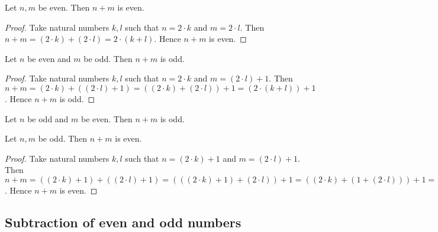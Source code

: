 \documentclass[../../arithmetic.tex]{subfiles}
\begin{document}
  \begin{forthel}
    \begin{proposition}\label{Arithmetic_03_07_501002}
      Let $n, m$ be even.
      Then $n + m$ is even.
    \end{proposition}
    \begin{proof}
      Take natural numbers $k, l$ such that $n = 2 \cdot k$ and $m = 2 \cdot l$.
      Then $n + m =
      (2 \cdot k) + (2 \cdot l) =
      2 \cdot (k + l)$.
      Hence $n + m$ is even.
    \end{proof}

    \begin{proposition}\label{Arithmetic_03_07_434363}
      Let $n$ be even and $m$ be odd.
      Then $n + m$ is odd.
    \end{proposition}
    \begin{proof}
      Take natural numbers $k, l$ such that $n = 2 \cdot k$ and $m = (2 \cdot l) + 1$.
      Then $n + m =
      (2 \cdot k) + ((2 \cdot l) + 1) =
      ((2 \cdot k) + (2 \cdot l)) + 1 =
      (2 \cdot (k + l)) + 1$.
      Hence $n + m$ is odd.
    \end{proof}

    \begin{corollary}\label{Arithmetic_03_07_763076}
      Let $n$ be odd and $m$ be even.
      Then $n + m$ is odd.
    \end{corollary}

    \begin{proposition}\label{Arithmetic_03_07_147414}
      Let $n, m$ be odd.
      Then $n + m$ is even.
    \end{proposition}
    \begin{proof}
      Take natural numbers $k, l$ such that $n = (2 \cdot k) + 1$ and $m = (2 \cdot l) + 1$.
      Then $n + m =
      ((2 \cdot k) + 1) + ((2 \cdot l) + 1) =
      (((2 \cdot k) + 1) + (2 \cdot l)) + 1 =
      ((2 \cdot k) + (1 + (2 \cdot l))) + 1 =
      ((2 \cdot k) + ((2 \cdot l) + 1)) + 1 =
      (((2 \cdot k) + (2 \cdot l)) + 1) + 1 =
      ((2 \cdot k) + (2 \cdot l)) + (1 + 1) =
      ((2 \cdot k) + (2 \cdot l)) + 2 =
      (2 \cdot (k + l)) + 2 =
      2 \cdot ((k + l) + 1)$.
      Hence $n + m$ is even.
    \end{proof}
  \end{forthel}


  \subsection{Subtraction of even and odd numbers}
\end{document}
